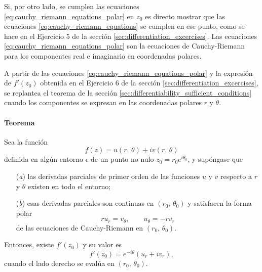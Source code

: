 \documentclass[a4paper]{report}
\begin{document}
Si, por otro lado, se cumplen las ecuaciones \ref{eq:cauchy_riemann_equations_polar} en \(z_0\) es directo mostrar que las ecuaciones \ref{eq:cauchy_riemann_equations} se cumplen en ese punto, como se hace en el Ejercicio 5 de la sección \ref{sec:differentiation_excercises}. Las ecuaciones \ref{eq:cauchy_riemann_equations_polar} son la ecuaciones de Cauchy-Riemann para los componentes real e imaginario en coordenadas polares.

A partir de las ecuaciones \ref{eq:cauchy_riemann_equations_polar} y la expresión de \(f'(z_0)\) obtenida en el Ejercicio 6 de la sección \ref{sec:differentiation_excercises}, se replantea el teorema de la sección \ref{sec:differentiability_sufficient_conditions} cuando los componentes se expresan en las coordenadas polares \(r\) y \(\theta\).

\paragraph{Teorema} Sea la función
\[
 f(z)=u(r,\,\theta)+iv(r,\,\theta)
\]
definida en algún entorno \(\epsilon\) de un punto no nulo \(z_0=r_0e^{i\theta_0}\), y supóngase que 
\begin{enumerate}
 \item[(\textit{a})] las derivadas parciales de primer orden de las funciones \(u\) y \(v\) respecto a \(r\) y \(\theta\) existen en todo el entorno;
 \item[(\textit{b})] esas derivadas parciales son continuas en \((r_0,\,\theta_0)\) y satisfacen la forma polar
 \[
 ru_r=v_\theta ,
 \qquad
 u_\theta=-rv_r
\]
de las ecuaciones de Cauchy-Riemann en \((r_0,\,\theta_0)\).  
\end{enumerate}
Entonces, existe \(f'(z_0)\) y su valor es
\[
 f'(z_0)=e^{-i\theta}(u_r+iv_r),
\]
cuando el lado derecho se evalúa en \((r_0,\,\theta_0)\).
\end{document}
